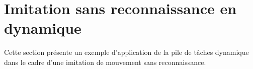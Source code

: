 \section{Imitation sans reconnaissance en dynamique}
\label{chap:basics:sec:imitDyn}

Cette section pr\'esente un exemple d'application
de la pile de t\^aches dynamique dans le cadre
d'une imitation de mouvement sans reconnaissance.
